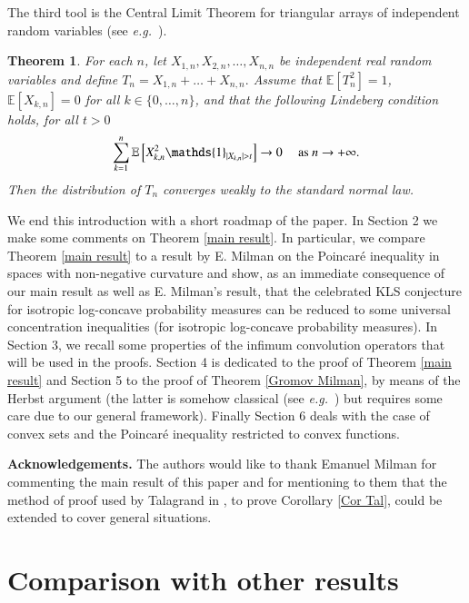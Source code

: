 \documentclass[11pt]{amsart}
\newtheorem{thm}[equation]{Theorem}
\numberwithin{equation}{section}
\begin{document}
The third tool is the Central Limit Theorem for triangular arrays of independent random variables  (see \textit{e.g.}\ \cite[p. 530]{F71}).
\begin{thm}\label{TCL}  For each $n$, let $X_{1,n}, X_{2,n},\ldots ,X_{n,n}$ be independent real random variables and define $T_n= X_{1,n}+\ldots +X_{n,n}.$ Assume that 
${\mathbb{E}}[T_n^2] =1$,  ${\mathbb{E}}[X_{k,n}]=0$ for all $k\in\{0,\ldots,n\}$, and that the following Lindeberg condition holds, for all $t>0$
\begin{eqnarray}\label{lindeberg}
\sum_{k=1}^n {\mathbb{E}} \left[X_{k,n}^2{\mathds{1}}_{|X_{k,n}|>t}\right]\to 0\quad \hbox{ as } n\to +\infty.
\end{eqnarray}
Then the distribution of $T_n$ converges weakly to the standard normal law.
\end{thm}

We end this introduction with a short roadmap of the paper.
In Section 2 we make some comments on Theorem \ref{main result}. In particular, we compare Theorem \ref{main result} to a result by E. Milman on the Poincar\'e inequality in spaces with non-negative curvature and show, as an immediate consequence of our main result as well as E. Milman's result, that the celebrated KLS conjecture for isotropic log-concave probability measures can be reduced to some universal concentration inequalities (for isotropic
log-concave probability measures). In Section 3, we recall some properties of the infimum convolution operators that will be used in the proofs. Section 4 is dedicated to the proof of Theorem \ref{main result}
and Section 5 to the proof of Theorem \ref{Gromov Milman}, by means of the Herbst argument (the latter is somehow classical (see \textit{e.g.}\ \cite{ane,Ledoux-book}) but requires some care due to our general framework).  Finally Section 6 deals with the case of convex sets and the Poincar\'e inequality restricted to convex functions.

\medskip

\textbf{Acknowledgements.} The authors would like to thank Emanuel Milman for commenting the main result of this paper and for mentioning to them that the method of proof used by Talagrand in \cite{Tal91}, to prove Corollary \ref{Cor Tal}, could be extended to cover general situations.

\section{Comparison with other results}
\end{document}
